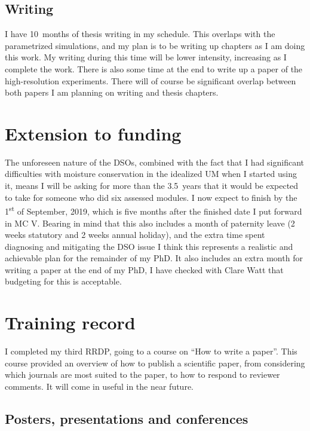 \documentclass[11pt,a4paper]{article}
\newcommand{\ts}{\textsuperscript}
\begin{document}
\subsection{Writing}
\label{sec:Writing}

I have \SI{10}{months} of thesis writing in my schedule. This overlaps with the  parametrized simulations, and my plan is to be writing up chapters as I am doing this work. My writing during this time will be lower intensity, increasing as I complete the work. There is also some time at the end to write up a paper of the high-resolution experiments. There will of course be significant overlap between both papers I am planning on writing and thesis chapters.

\section{Extension to funding}
\label{sec:extension}

The unforeseen nature of the DSOs, combined with the fact that I had significant difficulties with moisture conservation in the idealized UM when I started using it, means I will be asking for more than the \SI{3.5}{years} that it would be expected to take for someone who did six assessed modules. 
I now expect to finish by the 1\ts{st} of September, 2019, which is five months after the finished date I put forward in MC V. Bearing in mind that this also includes a month of paternity leave (2 weeks statutory and 2 weeks annual holiday), and the extra time spent diagnosing and mitigating the DSO issue I think this represents a realistic and achievable plan for the remainder of my PhD. It also includes an extra month for writing a paper at the end of my PhD, I have checked with Clare Watt that budgeting for this is acceptable.

\section{Training record}
\label{sec:Training record}

I completed my third RRDP, going to a course on ``How to write a paper''. This course provided an overview of how to publish a scientific paper, from considering which journals are most suited to the paper, to how to respond to reviewer comments. It will come in useful in the near future.

\subsection{Posters, presentations and conferences}
\label{sec:presentations}
\end{document}
